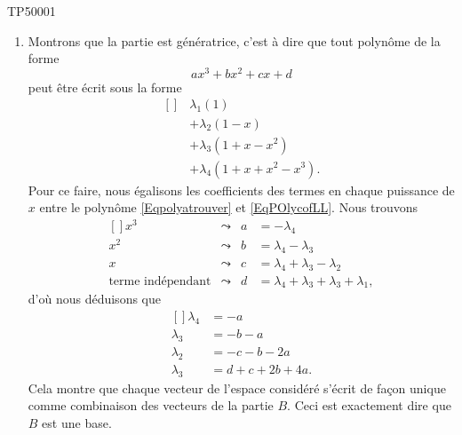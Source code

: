 \begin{corrige}{TP50001}

	\begin{enumerate}

		\item
			


	Montrons que la partie est génératrice, c'est à dire que tout polynôme de la forme
	\begin{equation}		\label{Eqpolyatrouver}
		ax^3+bx^2+cx+d
	\end{equation}
	peut être écrit sous la forme
	\begin{equation}		\label{EqPOlycofLL}
		\begin{aligned}[]
			&\lambda_1(1)\\
			&+\lambda_2(1-x)\\
			&+\lambda_3(1+x-x^2)\\
			&+\lambda_4(1+x+x^2-x^3).
		\end{aligned}
	\end{equation}
	Pour ce faire, nous égalisons les coefficients des termes en chaque puissance de $x$ entre le polynôme \eqref{Eqpolyatrouver} et \eqref{EqPOlycofLL}. Nous trouvons
	\begin{equation}
		\begin{aligned}[]
			x^3&\leadsto &a&=-\lambda_4\\
			x^2&\leadsto &b&=\lambda_4-\lambda_3\\
			x&\leadsto &c&=\lambda_4+\lambda_3-\lambda_2\\
			\text{terme indépendant}&\leadsto &d&=\lambda_4+\lambda_3+\lambda_3+\lambda_1,
		\end{aligned}
	\end{equation}
	d'où nous déduisons que
	\begin{equation}		\label{EqSolspolyTPc}
		\begin{aligned}[]
			\lambda_4&=-a\\
			\lambda_3&=-b-a\\
			\lambda_2&=-c-b-2a\\
			\lambda_3&=d+c+2b+4a.
		\end{aligned}
	\end{equation}
	Cela montre que chaque vecteur de l'espace considéré s'écrit de façon unique comme combinaison des vecteurs de la partie $B$. Ceci est exactement dire que $B$ est une base.



\end{enumerate}
\end{corrige}
